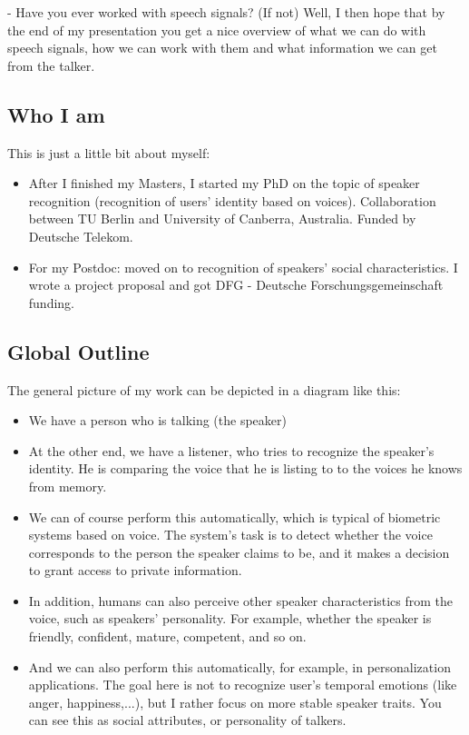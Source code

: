 \documentclass[a4paper]{article}
\begin{document}
- Have you ever worked with speech signals? (If not) Well, I then hope that by the end of my presentation you get a nice overview of what we can do with speech signals, how we can work with them and what information we can get from the talker.


\subsection{Who I am}

This is just a little bit about myself:

\begin{itemize}
	
\item After I finished my Masters, I started my PhD on the topic of speaker recognition (recognition of users' identity based on voices). Collaboration between TU Berlin and University of Canberra, Australia. Funded by Deutsche Telekom.

\item For my Postdoc: moved on to recognition of speakers' social characteristics. I wrote  a project proposal and got DFG - Deutsche Forschungsgemeinschaft funding.

\end{itemize}

\subsection{Global Outline}

The general picture of my work can be depicted in a diagram like this:

\begin{itemize}
	
\item We have a person who is talking (the speaker)

\item At the other end, we have a listener, who tries to recognize the speaker's identity. He is comparing the voice that he is listing to to the voices he knows from memory. 

\item We can of course perform this automatically, which is typical of biometric systems based on voice. The system's task is to detect whether the voice corresponds to the person the speaker claims to be, and it makes a decision to grant access to private information.

\item In addition, humans can also perceive other speaker characteristics from the voice, such as speakers' personality. For example, whether the speaker is friendly, confident, mature, competent, and so on.

\item And we can also perform this automatically, for example, in personalization applications. The goal here is not to recognize user's temporal emotions (like anger, happiness,...), but I rather focus on more stable speaker traits. You can see this as social attributes, or personality of talkers.
 
\end{itemize}
\end{document}
